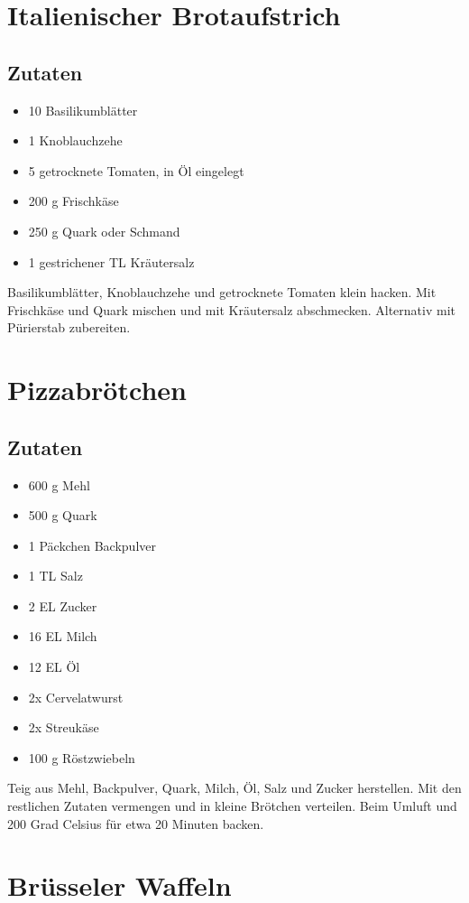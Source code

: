 \documentclass{article}
\begin{document}
\section{Italienischer Brotaufstrich}
\subsection*{Zutaten}
	\begin{itemize}
		\item 10 Basilikumblätter
		\item 1 Knoblauchzehe
		\item 5 getrocknete Tomaten, in Öl eingelegt
		\item 200 g Frischkäse
		\item 250 g Quark oder Schmand
		\item 1 gestrichener TL Kräutersalz
	\end{itemize}
	Basilikumblätter, Knoblauchzehe und getrocknete Tomaten klein hacken.
	Mit Frischkäse und Quark mischen und mit Kräutersalz abschmecken.
	Alternativ mit Pürierstab zubereiten.

\section{Pizzabrötchen}
\subsection*{Zutaten}
	 \begin{itemize}
		\item 600 g Mehl
		\item 500 g Quark
		\item 1 Päckchen Backpulver
		\item 1 TL Salz
		\item 2 EL Zucker
		\item 16 EL Milch
		\item 12 EL Öl
		\item 2x Cervelatwurst
		\item 2x Streukäse
		\item 100 g Röstzwiebeln
	\end{itemize}
	Teig aus Mehl, Backpulver, Quark, Milch, Öl, Salz und Zucker herstellen.
	Mit den restlichen Zutaten vermengen und in kleine Brötchen verteilen.
	Beim Umluft und 200 Grad Celsius für etwa 20 Minuten backen.

\section{Brüsseler Waffeln} %
\label{sec:bruesseler_waffeln}
\end{document}
